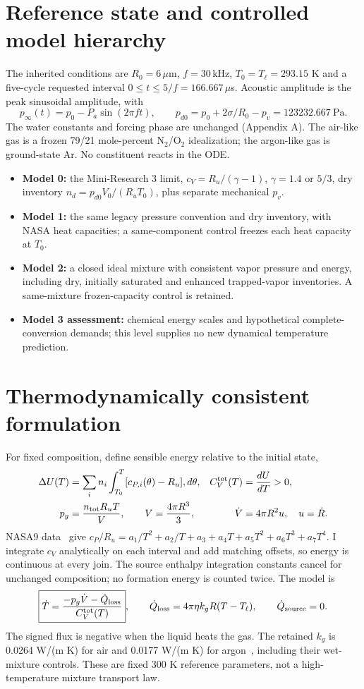 \documentclass[10pt,a4paper]{article}
\begin{document}
\section{Reference state and controlled model hierarchy}
The inherited conditions are $R_0=6\,\mu\mathrm m$, $f=30\,\mathrm{kHz}$, $T_0=T_\ell=293.15$ K and a five-cycle requested interval $0\le t\le5/f=166.667\,\mu$s. Acoustic amplitude is the peak sinusoidal amplitude, with
\[
p_\infty(t)=p_0-P_a\sin(2\pi ft),\qquad
p_{d0}=p_0+2\sigma/R_0-p_v=123232.667\ \mathrm{Pa}.
\]
The water constants and forcing phase are unchanged (Appendix A). The air-like gas is a frozen 79/21 mole-percent N$_2$/O$_2$ idealization; the argon-like gas is ground-state Ar. No constituent reacts in the ODE.

\begin{itemize}\setlength\itemsep{0pt}
\item \textbf{Model 0:} the Mini-Research 3 limit, $c_V=R_u/(\gamma-1)$, $\gamma=1.4$ or $5/3$, dry inventory $n_d=p_{d0}V_0/(R_uT_0)$, plus separate mechanical $p_v$.
\item \textbf{Model 1:} the same legacy pressure convention and dry inventory, with NASA heat capacities; a same-component control freezes each heat capacity at $T_0$.
\item \textbf{Model 2:} a closed ideal mixture with consistent vapor pressure and energy, including dry, initially saturated and enhanced trapped-vapor inventories. A same-mixture frozen-capacity control is retained.
\item \textbf{Model 3 assessment:} chemical energy scales and hypothetical complete-conversion demands; this level supplies no new dynamical temperature prediction.
\end{itemize}

\newpage
\section{Thermodynamically consistent formulation}
For fixed composition, define sensible energy relative to the initial state,
\begin{align}
\Delta U(T)&=\sum_i n_i\int_{T_0}^T[c_{P,i}(\theta)-R_u],d\theta,
& C_V^{\rm tot}(T)&=\frac{dU}{dT}>0,\\
p_g&=\frac{n_{\rm tot}R_uT}{V},\qquad V=\frac{4\pi R^3}{3},
&\dot V&=4\pi R^2u,\quad u=\dot R.
\end{align}
NASA9 data~\cite{nasa} give $c_P/R_u=a_1/T^2+a_2/T+a_3+a_4T+a_5T^2+a_6T^3+a_7T^4$. I integrate $c_V$ analytically on each interval and add matching offsets, so energy is continuous at every join. The source enthalpy integration constants cancel for unchanged composition; no formation energy is counted twice. The model is
\begin{equation}\label{eq:energy}
\boxed{\dot T=\frac{-p_g\dot V-\dot Q_{\rm loss}}{C_V^{\rm tot}(T)}},\qquad
\dot Q_{\rm loss}=4\pi\eta k_gR(T-T_\ell),\qquad \dot Q_{\rm source}=0.
\end{equation}
The signed flux is negative when the liquid heats the gas. The retained $k_g$ is 0.0264 W/(m K) for air and 0.0177 W/(m K) for argon~\cite{huber}, including their wet-mixture controls. These are fixed 300 K reference parameters, not a high-temperature mixture transport law.
\end{document}
